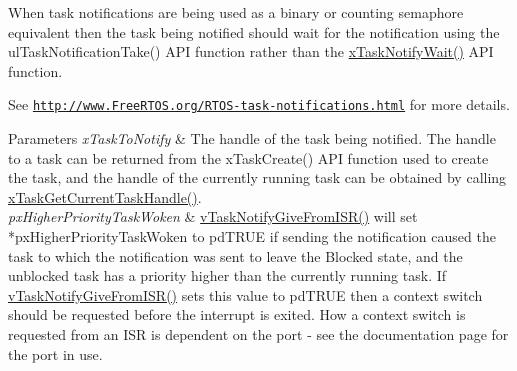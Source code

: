 \begin{DoxyPre}When task notifications are being used as a binary or counting semaphore
equivalent then the task being notified should wait for the notification
using the ulTaskNotificationTake() API function rather than the
\hyperlink{task_8h_a0475fcda9718f403521c270a7270ff93}{xTaskNotifyWait()} API function.\end{DoxyPre}



\begin{DoxyPre}See \href{http://www.FreeRTOS.org/RTOS-task-notifications.html}{\tt http://www.FreeRTOS.org/RTOS-task-notifications.html} for more details.\end{DoxyPre}



\begin{DoxyPre}
\begin{DoxyParams}{Parameters}
{\em xTaskToNotify} & The handle of the task being notified.  The handle to a
task can be returned from the xTaskCreate() API function used to create the
task, and the handle of the currently running task can be obtained by calling
\hyperlink{task_8h_a85a0f9c9f817b18686efbf8f37c72dfc}{xTaskGetCurrentTaskHandle()}.\\
\hline
{\em pxHigherPriorityTaskWoken} & \hyperlink{task_8h_a4a4bcf98ad282a596e13f3f30582a11b}{vTaskNotifyGiveFromISR()} will set
*pxHigherPriorityTaskWoken to pdTRUE if sending the notification caused the
task to which the notification was sent to leave the Blocked state, and the
unblocked task has a priority higher than the currently running task.  If
\hyperlink{task_8h_a4a4bcf98ad282a596e13f3f30582a11b}{vTaskNotifyGiveFromISR()} sets this value to pdTRUE then a context switch
should be requested before the interrupt is exited.  How a context switch is
requested from an ISR is dependent on the port - see the documentation page
for the port in use.
\\
\hline
\end{DoxyParams}
\end{DoxyPre}
